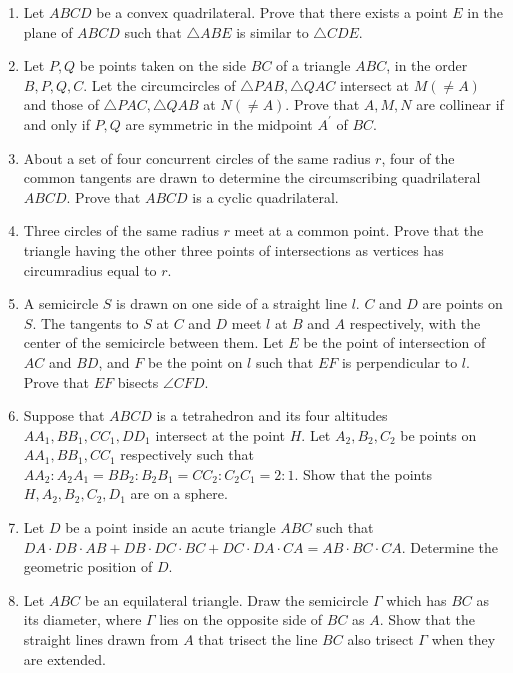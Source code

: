 \documentclass[12pt]{article}
\begin{document}
\begin{enumerate}[resume]
    \item Let $ABCD$ be a convex quadrilateral. Prove that there exists a point $E$ in the plane of $ABCD$ such that $\triangle ABE$ is similar to $\triangle CDE$.

    \item Let $P, Q$ be points taken on the side $BC$ of a triangle $ABC$, in the order $B, P, Q, C$. Let the circumcircles of $\triangle PAB, \triangle QAC$ intersect at $M (\ne A)$ and those of $\triangle PAC, \triangle QAB$ at $N (\ne A)$. Prove that $A, M, N$ are collinear if and only if $P, Q$ are symmetric in the midpoint $A^{\prime}$ of $BC$.

    \item About a set of four concurrent circles of the same radius $r$, four of the common tangents are drawn to determine the circumscribing quadrilateral $ABCD$. Prove that $ABCD$ is a cyclic quadrilateral.

    \item Three circles of the same radius $r$ meet at a common point. Prove that the triangle having the other three points of intersections as vertices has circumradius equal to $r$.

    \item A semicircle $S$ is drawn on one side of a straight line $l$. $C$ and $D$ are points on $S$. The tangents to $S$ at $C$ and $D$ meet $l$ at $B$ and $A$ respectively, with the center of the semicircle between them. Let $E$ be the point of intersection of $AC$ and $BD$, and $F$ be the point on $l$ such that $EF$ is perpendicular to $l$. Prove that $EF$ bisects $\angle CFD$.

    \item Suppose that $ABCD$ is a tetrahedron and its four altitudes $AA_{1}, BB_{1}, CC_{1}, DD_{1}$ intersect at the point $H$. Let $A_{2}, B_{2}, C_{2}$ be points on $AA_{1}, BB_{1}, CC_{1}$ respectively such that $AA_{2}:A_{2}A_{1}=BB_{2}:B_{2}B_{1}=CC_{2}:C_{2}C_{1}=2:1.$ Show that the points $H, A_{2}, B_{2}, C_{2}, D_{1}$ are on a sphere.

    \item Let $D$ be a point inside an acute triangle $ABC$ such that $DA\cdot DB\cdot AB+DB\cdot DC\cdot BC+DC\cdot DA\cdot CA=AB\cdot BC\cdot CA.$ Determine the geometric position of $D$.

    \item Let $ABC$ be an equilateral triangle. Draw the semicircle $\Gamma$ which has $BC$ as its diameter, where $\Gamma$ lies on the opposite side of $BC$ as $A$. Show that the straight lines drawn from $A$ that trisect the line $BC$ also trisect $\Gamma$ when they are extended.


\end{enumerate}
\end{document}
